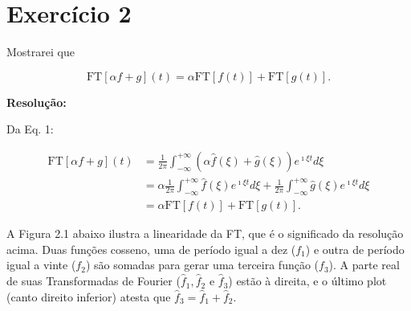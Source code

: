 
\section*{\large Exercício 2}
%

Mostrarei que

\begin{equation*}
\text{FT}[\alpha f + g](t) = \alpha \text{FT}[f(t)] + \text{FT}[g(t)].
\end{equation*}

\textbf{Resolução:}

Da Eq. 1:

\begin{align*}
\text{FT}[\alpha f + g](t) &= \frac{1}{2 \pi} \int_{-\infty}^{+\infty} (\alpha \hat{f}(\xi) + \hat{g}(\xi)) e^{\imath \xi t} d\xi \\[10pt]
&= \alpha \frac{1}{2 \pi} \int_{-\infty}^{+\infty} \hat{f}(\xi)e^{\imath \xi t} d\xi + \frac{1}{2 \pi} \int_{-\infty}^{+\infty} \hat{g}(\xi) e^{\imath \xi t} d \xi \\[10pt]
 &= \alpha \text{FT}[f(t)] + \text{FT}[g(t)]. \tag*{(Q.E.D.)}
\end{align*}

A Figura 2.1 abaixo ilustra a linearidade da FT, que é o significado da resolução acima. Duas funções cosseno, uma de período igual a dez ($f_{1}$) e outra de período igual a vinte ($f_{2}$) são somadas para gerar uma terceira função ($f_{3}$). A parte real de suas Transformadas de Fourier ($\hat{f}_{1}, \hat{f}_{2}$ e $\hat{f}_{3}$) estão à direita, e o último plot (canto direito inferior) atesta que $\hat{f}_{3} = \hat{f}_{1} + \hat{f}_{2}$.

